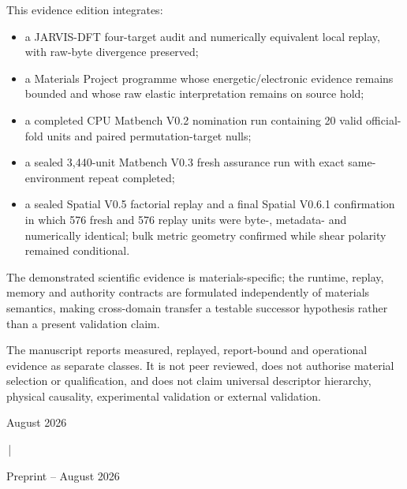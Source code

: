 \documentclass[11pt,a4paper,oneside]{report}
\begin{document}
\begin{titlepage}
\begin{center}
\begin{minipage}{0.90\textwidth}
This evidence edition integrates:
\begin{itemize}
\item a JARVIS-DFT four-target audit and numerically equivalent local replay, with raw-byte divergence preserved;
\item a Materials Project programme whose energetic/electronic evidence remains bounded and whose raw elastic interpretation remains on source hold;
\item a completed CPU Matbench V0.2 nomination run containing 20 valid official-fold units and paired permutation-target nulls;
\item a sealed 3,440-unit Matbench V0.3 fresh assurance run with exact same-environment repeat completed;
\item a sealed Spatial V0.5 factorial replay and a final Spatial V0.6.1 confirmation in which 576 fresh and 576 replay units were byte-, metadata- and numerically identical; bulk metric geometry confirmed while shear polarity remained conditional.
\end{itemize}
The demonstrated scientific evidence is materials-specific; the runtime, replay, memory and authority contracts are formulated independently of materials semantics, making cross-domain transfer a testable successor hypothesis rather than a present validation claim.

The manuscript reports measured, replayed, report-bound and operational evidence as separate classes. It is not peer reviewed, does not authorise material selection or qualification, and does not claim universal descriptor hierarchy, physical causality, experimental validation or external validation.



\end{minipage}



\vspace{0.6cm}



{\small

August 2026

\,|\,

Preprint -- August 2026

}



\end{center}



\end{titlepage}
\end{document}
